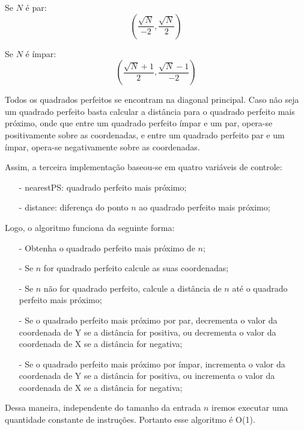 \documentclass[12pt,a4paper]{article}
\begin{document}
        Se $N$ é par:
        $$(\frac{\sqrt{N}}{-2}, \frac{\sqrt{N}}{2})$$
        
        Se $N$ é ímpar:
        $$(\frac{\sqrt{N} + 1}{2}, \frac{\sqrt{N} - 1}{-2})$$
        
        Todos os quadrados perfeitos se encontram na diagonal principal. Caso não seja um quadrado perfeito basta calcular a distância para o quadrado perfeito mais próximo, onde que entre um quadrado perfeito ímpar e um par, opera-se positivamente sobre as coordenadas, e entre um quadrado perfeito par e um ímpar, opera-se negativamente sobre as coordenadas.

        
        Assim, a terceira implementação baseou-se em quatro variáveis de controle:
        \begin{itemize}
        	\item[-] nearestPS: quadrado perfeito mais próximo;
        	\item[-] distance: diferença do ponto $n$ ao quadrado perfeito mais próximo;
    	\end{itemize}
    	
        Logo, o algoritmo funciona da seguinte forma:
        \begin{itemize}
        	\item[-] Obtenha o quadrado perfeito mais próximo de $n$;
        	\item[-] Se $n$ for quadrado perfeito calcule as suas coordenadas;
        	\item[-] Se $n$ não for quadrado perfeito, calcule a distância de $n$ até o quadrado perfeito mais próximo;
        	\item[-] Se o quadrado perfeito mais próximo por par, decrementa o valor da coordenada de Y se a distância for positiva, ou decrementa o valor da coordenada de X se a distância for negativa;
        	\item[-] Se o quadrado perfeito mais próximo por ímpar, incrementa o valor da coordenada de Y se a distância for positiva, ou incrementa o valor da coordenada de X se a distância for negativa;
        	
    	\end{itemize}
        Dessa maneira, independente do tamanho da entrada $n$ iremos executar uma quantidade constante de instruções. Portanto esse algoritmo é O(1).
\end{document}
